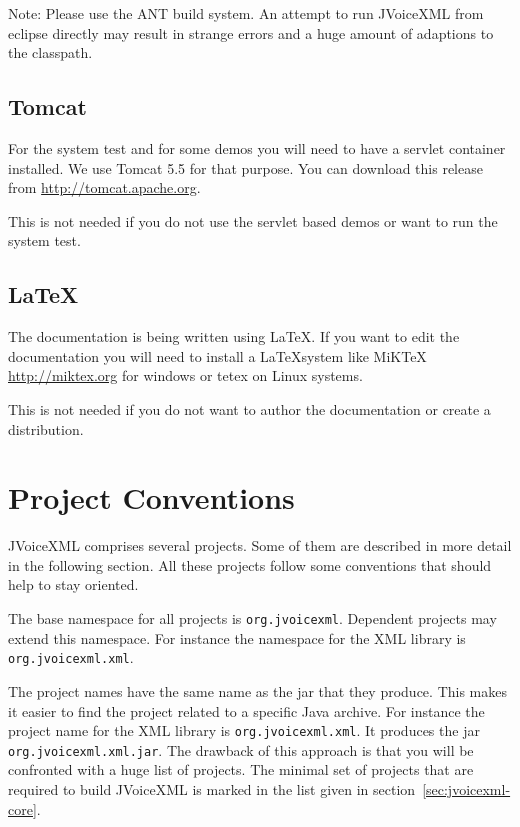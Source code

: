 \documentclass[11pt,a4paper]{article}
\begin{document}
Note: Please use the ANT build system. An attempt to run JVoiceXML from eclipse
directly may result in strange errors and a huge amount of adaptions to the
classpath.

\subsection{Tomcat}
\label{sec:tomcat}

For the system test and for some demos you will need to have a servlet
container installed. We use Tomcat 5.5 for that purpose. You can download this
release from \url{http://tomcat.apache.org}.

This is not needed if you do not use the servlet based demos or want to run the
system test.

\subsection{\LaTeX}

The documentation is being written using \LaTeX. If you want to edit the
documentation you will need to install a \LaTeX system like MiKTeX
\url{http://miktex.org} for windows or tetex on Linux systems.

This is not needed if you do not want to author the documentation or create a
distribution.

\section{Project Conventions}

JVoiceXML comprises several projects. Some of them are described in more
detail in the following section. All these projects follow some conventions
that should help to stay oriented.

The base namespace for all projects is \lstinline{org.jvoicexml}. Dependent 
projects may extend this namespace. For instance the namespace for the
XML library is \lstinline{org.jvoicexml.xml}.

The project names have the same name as the jar that they produce. This
makes it easier to find the project related to a specific Java archive.
For instance the project name for the XML library is
\lstinline{org.jvoicexml.xml}. It produces the jar
\texttt{org.jvoicexml.xml.jar}.
The drawback of this approach is that you will be confronted 
with a huge list of projects. The minimal set of projects
that are required to build JVoiceXML is marked in the list
given in section~\ref{sec:jvoicexml-core}.
\end{document}
